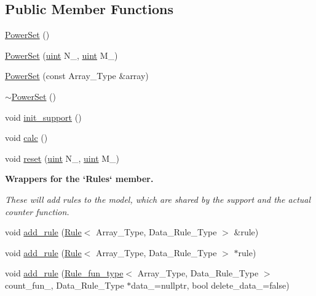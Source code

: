 \subsection*{Public Member Functions}
\begin{DoxyCompactItemize}
\item 
\hyperlink{class_power_set_a095815ccc44c88e0da73d92c6b5cf5f3}{Power\+Set} ()
\item 
\hyperlink{class_power_set_abf6ac4224da7ae4d187d0d63833615b1}{Power\+Set} (\hyperlink{typedefs_8hpp_a91ad9478d81a7aaf2593e8d9c3d06a14}{uint} N\+\_\+, \hyperlink{typedefs_8hpp_a91ad9478d81a7aaf2593e8d9c3d06a14}{uint} M\+\_\+)
\item 
\hyperlink{class_power_set_acc20a68ff11aa1891d9a0676ed50808f}{Power\+Set} (const Array\+\_\+\+Type \&array)
\item 
\hyperlink{class_power_set_a89a176c9517e81a066adffad3c46aba5}{$\sim$\+Power\+Set} ()
\item 
void \hyperlink{class_power_set_a8eefc9606c6339938a8d9adcd0d7e153}{init\+\_\+support} ()
\item 
void \hyperlink{class_power_set_ad3b707294498105b2cc1a04017cc96d2}{calc} ()
\item 
void \hyperlink{class_power_set_aba11dd8802cd2eb529c7c30b55994248}{reset} (\hyperlink{typedefs_8hpp_a91ad9478d81a7aaf2593e8d9c3d06a14}{uint} N\+\_\+, \hyperlink{typedefs_8hpp_a91ad9478d81a7aaf2593e8d9c3d06a14}{uint} M\+\_\+)
\end{DoxyCompactItemize}
\begin{Indent}\textbf{ Wrappers for the `\+Rules` member.}\par
{\em These will add rules to the model, which are shared by the support and the actual counter function. }\begin{DoxyCompactItemize}
\item 
void \hyperlink{class_power_set_a00ee318a40da91bcf0bff79bf71454ab}{add\+\_\+rule} (\hyperlink{class_rule}{Rule}$<$ Array\+\_\+\+Type, Data\+\_\+\+Rule\+\_\+\+Type $>$ \&rule)
\item 
void \hyperlink{class_power_set_a6cb8fb8f09b4c190e2ac6c07daa1241e}{add\+\_\+rule} (\hyperlink{class_rule}{Rule}$<$ Array\+\_\+\+Type, Data\+\_\+\+Rule\+\_\+\+Type $>$ $\ast$rule)
\item 
void \hyperlink{class_power_set_aae5eae12186fff037efa3884ac2b3dcc}{add\+\_\+rule} (\hyperlink{typedefs_8hpp_a2e147c9c0e8b65be614c98a5dd400d5c}{Rule\+\_\+fun\+\_\+type}$<$ Array\+\_\+\+Type, Data\+\_\+\+Rule\+\_\+\+Type $>$ count\+\_\+fun\+\_\+, Data\+\_\+\+Rule\+\_\+\+Type $\ast$data\+\_\+=nullptr, bool delete\+\_\+data\+\_\+=false)
\end{DoxyCompactItemize}
\end{Indent}

